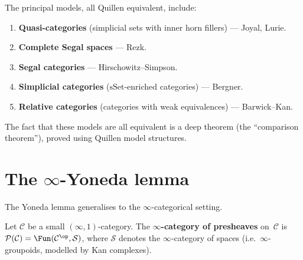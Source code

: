\begin{remark}\label{rem:models-infty1}
The principal models, all Quillen equivalent, include:
\begin{enumerate}[label=(\roman*)]
\item \textbf{Quasi-categories} (simplicial sets with inner horn fillers)
      --- Joyal, Lurie.
\item \textbf{Complete Segal spaces} --- Rezk.
\item \textbf{Segal categories} --- Hirschowitz--Simpson.
\item \textbf{Simplicial categories} ($\mathrm{sSet}$-enriched categories)
      --- Bergner.
\item \textbf{Relative categories} (categories with weak equivalences)
      --- Barwick--Kan.
\end{enumerate}
The fact that these models are all equivalent is a deep theorem
(the ``comparison theorem''), proved using Quillen model structures.
\end{remark}



\section{The $\infty$-Yoneda lemma}\label{sec:infty-yoneda}


The Yoneda lemma generalises to the $\infty$-categorical setting.

\begin{definition}\label{def:infty-presheaf}
Let $\mathcal{C}$ be a small $(\infty,1)$-category.
The \textbf{$\infty$-category of presheaves} on~$\mathcal{C}$ is
$\mathcal{P}(\mathcal{C}) = \Fun(\mathcal{C}^{\op}, \mathcal{S})$,
where $\mathcal{S}$ denotes the $\infty$-category of spaces
(i.e.\ $\infty$-groupoids, modelled by Kan complexes).
\end{definition}

